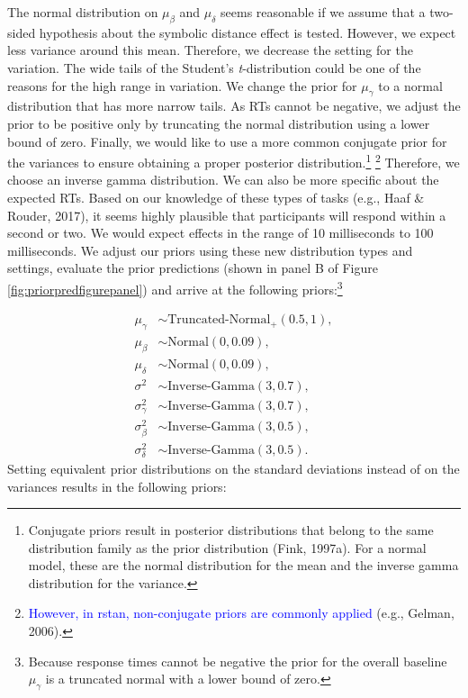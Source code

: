 \documentclass[
  english,
  doc,floatsintext]{apa6}
\begin{document}
The normal distribution on \(\mu_{\beta}\) and \(\mu_{\delta}\) seems reasonable if we assume that a two-sided hypothesis about the symbolic distance effect is tested. However, we expect less variance around this mean. Therefore, we decrease the setting for the variation. The wide tails of the Student's \emph{t}-distribution could be one of the reasons for the high range in variation. We change the prior for \(\mu_{\gamma}\) to a normal distribution that has more narrow tails. As RTs cannot be negative, we adjust the prior to be positive only by truncating the normal distribution using a lower bound of zero. Finally, we would like to use a more common conjugate prior for the variances to ensure obtaining a proper posterior distribution.\footnote{Conjugate priors result in posterior distributions that belong to the same distribution family as the prior distribution (Fink, 1997a). For a normal model, these are the normal distribution for the mean and the inverse gamma distribution for the variance.} \footnote{\textcolor{blue}{However, in rstan, non-conjugate priors are commonly applied} (e.g., Gelman, 2006).} Therefore, we choose an inverse gamma distribution. We can also be more specific about the expected RTs. Based on our knowledge of these types of tasks (e.g., Haaf \& Rouder, 2017), it seems highly plausible that participants will respond within a second or two. We would expect effects in the range of 10 milliseconds to 100 milliseconds. We adjust our priors using these new distribution types and settings, evaluate the prior predictions (shown in panel B of Figure \ref{fig:priorpredfigurepanel}) and arrive at the following priors:\footnote{Because response times cannot be negative the prior for the overall baseline \(\mu_\gamma\) is a truncated normal with a lower bound of zero.}

\begin{equation}
\begin{aligned}
\mu_{\gamma} &\sim \text{Truncated-Normal}_{+}(0.5, 1), \label{eq:chosenpriors2var} \\
\mu_{\beta} &\sim \text{Normal}(0, 0.09), \\
\mu_{\delta} &\sim \text{Normal}(0, 0.09), \\
\sigma^2 &\sim \text{Inverse-Gamma}(3, 0.7),  \\
\sigma^2_{\gamma} &\sim \text{Inverse-Gamma}(3, 0.7), \\   
\sigma^2_{\beta} &\sim \text{Inverse-Gamma}(3, 0.5), \\   
\sigma^2_{\delta} &\sim \text{Inverse-Gamma}(3, 0.5).    
\end{aligned}
\end{equation}
Setting equivalent prior distributions on the standard deviations instead of on the variances results in the following priors:
\end{document}
